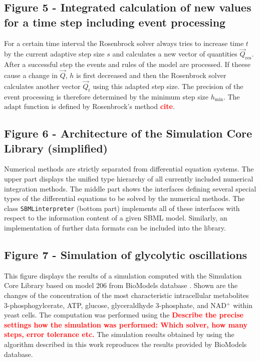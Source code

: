 \documentclass[10pt]{bmc_article}
\newenvironment{bmcformat}{\baselineskip20pt\sloppy\setboolean{publ}{false}}{\baselineskip20pt\sloppy}
\newcommand{\TODO}[1]{\textcolor{red}{\textbf{#1}}}
\newcommand{\SBMLinterpreter}{\texttt{SBML\-interpreter}}
\begin{document}
\begin{bmcformat}
\subsection*{Figure 5 - Integrated calculation of new values for a time step including event processing}
For a certain time interval the Rosenbrock solver always tries to increase time $t$ by the current adaptive
step size $s$ and calculates a new vector of quantities $\vec{Q}_{\mathrm{res}}$.
After a successful step the events and rules of the model are processed.
If theese cause a change in $\vec{Q}$, $h$ is first decreased and then the Rosenbrock solver calculates another vector $\vec{Q}_{t}$ using this adapted step size.
The precision of the event processing is therefore determined by the minimum step size $h_{\min}$.
The $\mathrm{adapt}$ function is defined by Rosenbrock's method \TODO{cite}.

\subsection*{Figure 6 - Architecture of the Simulation Core Library (simplified)}
Numerical methods are strictly separated from differential equation systems. The
upper part displays the unified type hierarchy of all currently included numerical integration
methods. The middle part shows the interfaces defining several
special types of the differential equations to be solved by the numerical
methods.
The class \SBMLinterpreter{} (bottom part) implements all of these interfaces
with respect to the information content of a given SBML model. Similarly, an
implementation of further data formats can be included into the
library.

\subsection*{Figure 7 - Simulation of glycolytic oscillations}
This figure displays the results of a simulation computed with the Simulation Core Library based on model 206 from BioModels database \cite{Novere2006a, Wolf2000}.
Shown are the changes of the concentration of the most characteristic intracellular metabolites 3-phosphogylcerate, ATP, glucose, glyceraldhyde 3-phosphate, and NAD$^+$ within yeast cells.
The computation was performed using the \TODO{Describe the precise settings how the simulation was performed: Which solver, how many steps, error tolerance etc.}
The simulation results obtained by using the algorithm described in this work reproduces the results provided by BioModels database. 


\end{bmcformat}
\end{document}
